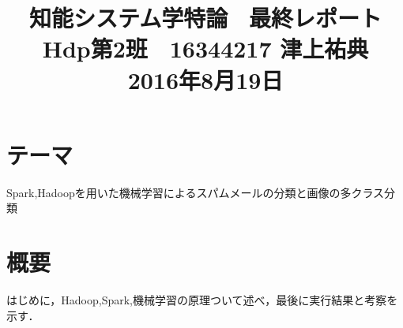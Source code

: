 \documentclass[a4paper,12pt]{jarticle}
\begin{document}
%
\title{\vspace{-30mm}知能システム学特論 \ 最終レポート\\ Hdp第2班　16344217 津上祐典\\ 2016年8月19日}
\date{}
%
%
\maketitle
%
\vspace{-30mm}
%
 \section{テーマ}
Spark,Hadoopを用いた機械学習によるスパムメールの分類と画像の多クラス分類
\section{概要}
はじめに，Hadoop,Spark,機械学習の原理ついて述べ，最後に実行結果と考察を
示す．
\end{document}
